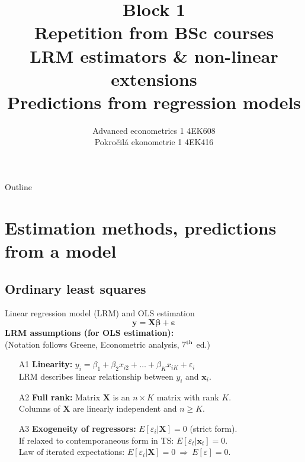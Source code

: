 \documentclass{beamer}
\title[Block 1]{Block 1 \\  Repetition from BSc courses  \\ LRM estimators \& non-linear extensions\\ Predictions from regression models}
\author{Advanced econometrics 1 4EK608 \\Pokročilá ekonometrie 1 4EK416}
\institute{Vysoká škola ekonomická v Praze}
\date{}
\begin{document}
 
\begin{frame}
  \titlepage
\end{frame}

\begin{frame}{Outline}
  \tableofcontents
\end{frame}

\section{Estimation methods, predictions from a model}
\subsection{Ordinary least squares}
\begin{frame}{Linear regression model (LRM) and OLS estimation}
$$
\bm{y} = \bm{X\beta} + \bm{\varepsilon}
$$
\textbf{LRM assumptions (for OLS estimation):}\\
(Notation follows Greene, Econometric analysis, $7^{\textnormal{th}}$ ed.)
\medskip
\begin{enumerate}
    \item[A1] \textbf{Linearity:} $y_i = \beta_1 + \beta_2 x_{i2} + \dots + \beta_K x_{iK} + \varepsilon_i$ \\LRM describes linear relationship between $y_i$ and $\bm{x}_i$.
    \item[A2] \textbf{Full rank:} Matrix $\bm{X}$ is an $n \! \times \! K$ matrix with rank $K$.\\ Columns of $\bm{X}$ are linearly independent and $n \geq K$.
    \item[A3] \textbf{Exogeneity of regressors:} $E[\varepsilon_i | \bm{X}]=0$ (strict form). \\If relaxed to contemporaneous form in TS: $E[\varepsilon_t | \bm{x}_t]=0$.\\Law of iterated expectations: $E[\varepsilon_i | \bm{X}]=0 ~\Rightarrow~ E[\varepsilon]=0$.
\end{enumerate}
\end{frame}
\end{document}
